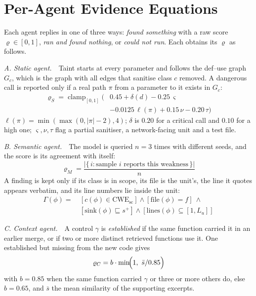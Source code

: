 \documentclass[conference,10pt]{IEEEtran}
\newcommand{\clampop}{\operatorname{clamp}}
\begin{document}
\section*{Per-Agent Evidence Equations}

Each agent replies in one of three ways: \emph{found something} with a raw score $\varrho\in[0,1]$,
\emph{ran and found nothing}, or \emph{could not run}. Each obtains its $\varrho$ as follows.

\smallskip\noindent\textit{A. Static agent.}\ \ Taint starts at every parameter and follows the
def--use graph $G_c$, which is the graph with all edges that sanitise class $c$ removed. A dangerous
call is reported only if a real path $\pi$ from a parameter to it exists in $G_c$:
\begin{equation}
\begin{split}
\varrho_S=\clampop_{[0,1]}\bigl(&0.45+\delta(d)-0.25\,\varsigma\\
&-0.0125\,\ell(\pi)+0.15\,\nu-0.20\,\tau\bigr)
\end{split}
\end{equation}
$\ell(\pi)=\min(\max(0,|\pi|-2),4)$; $\delta$ is $0.20$ for a critical call and $0.10$ for a high one;
$\varsigma,\nu,\tau$ flag a partial sanitiser, a network-facing unit and a test file.

\smallskip\noindent\textit{B. Semantic agent.}\ \ The model is queried $n=3$ times with different
seeds, and the score is its agreement with itself:
\begin{equation}
\varrho_M=\frac{|\{\,i : \text{sample } i \text{ reports this weakness}\,\}|}{n}
\end{equation}
A finding is kept only if its class is in scope, its file is the unit's, the line it quotes appears
verbatim, and its line numbers lie inside the unit:
\begin{equation}
\begin{split}
\Gamma(\phi)=\ & [c(\phi)\in\mathrm{CWE}_{\mathrm{sc}}] \wedge [\mathrm{file}(\phi)=f]\ \wedge\\
& [\mathrm{sink}(\phi)\sqsubseteq s^{+}] \wedge [\mathrm{lines}(\phi)\subseteq[1,L_u]]
\end{split}
\end{equation}

\smallskip\noindent\textit{C. Context agent.}\ \ A control $\gamma$ is \emph{established} if the same
function carried it in an earlier merge, or if two or more distinct retrieved functions use it. One
established but missing from the new code gives
\begin{equation}
\varrho_C=b\cdot\min\!\Bigl(1,\ \bar{s}/0.85\Bigr)
\end{equation}
with $b=0.85$ when the same function carried $\gamma$ or three or more others do, else $b=0.65$, and
$\bar{s}$ the mean similarity of the supporting excerpts.
\end{document}

